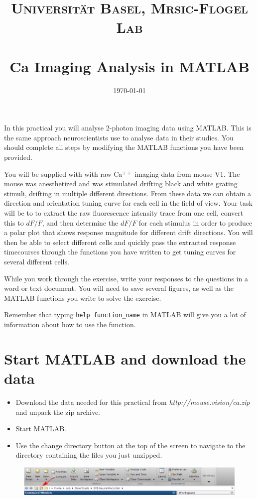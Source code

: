 \documentclass[paper=a4, fontsize=11pt]{scrartcl} %
\title{%
\normalfont \normalsize 
\textsc{Universit\"{a}t Basel, Mrsic-Flogel Lab} \\ [25pt] %
\horrule{0.5pt} \\[0.2cm] %
\huge Ca\supr{++} Imaging Analysis in MATLAB
\horrule{1.5pt}\\ %
}
\author{}
\date{\normalsize\today} %
\numberwithin{equation}{section} %
\numberwithin{figure}{section} %
\numberwithin{table}{section} %
\newcommand{\supr}[1]{\ensuremath{^{#1}}}
\begin{document}
\maketitle %

In this practical you will analyse 2-photon imaging data using MATLAB. This is the same approach 
neuroscientists use to analyse data in their studies. You should complete all steps by modifying the 
MATLAB functions you have been provided.


You will be supplied with with raw Ca\supr{++} imaging data from mouse V1. The mouse 
was anesthetized and was stimulated drifting black and white grating stimuli, drifting in multiple different directions. From these data
we can obtain a direction and orientation tuning curve for each cell in the field of view. Your task will be to to 
extract the raw fluorescence intensity trace from one cell, convert this to $dF/F$, and then 
determine the $dF/F$ for each stimulus in order to produce a polar plot that shows response magnitude
for different drift directions. You will then be able to select different cells and quickly pass the extracted 
response timecourses through the functions you have written to get tuning curves for several 
different cells. 


While you work through the exercise, write your responses to the questions in a word or text document. You will need to save several figures, as well as the MATLAB functions you write to solve the exercise.


Remember that typing \texttt{help function\_name} in MATLAB will give you a lot of information about how to use the function.

\section{Start MATLAB and download the data}
\begin{itemize}
\setlength{\parskip}{0.25em}
\item Download the data needed for this practical from \textit{http://mouse.vision/ca.zip} and unpack the zip archive. 
\item Start MATLAB.
\item Use the change directory button at the top of the screen to navigate to the 
directory containing the files you just unzipped. 
\end{itemize}

\begin{figure}
    \centering
    \includegraphics[width=\textwidth]{change_dir.eps}
    \caption{}
\end{figure}
\end{document}
